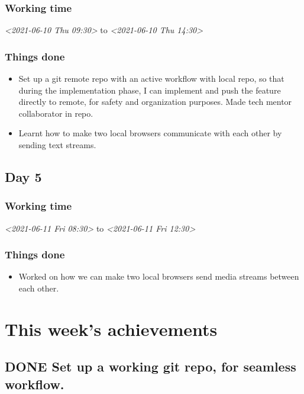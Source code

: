 \documentclass[11pt]{article}
\begin{document}
\subsubsection*{Working time}
\label{sec:org8737acd}
\textit{<2021-06-10 Thu 09:30> } to \textit{<2021-06-10 Thu 14:30>}
\subsubsection*{Things done}
\label{sec:org863a890}
\begin{itemize}
\item Set up a git remote repo with an active workflow with local repo, so that during the implementation phase, I can implement and push the feature directly to remote, for safety and organization purposes. Made tech mentor collaborator in repo.
\item Learnt how to make two local browsers communicate with each other by sending text streams.
\end{itemize}

\subsection*{Day 5}
\label{sec:orge735228}

\subsubsection*{Working time}
\label{sec:org2319456}
\textit{<2021-06-11 Fri 08:30> } to \textit{<2021-06-11 Fri 12:30>}

\subsubsection*{Things done}
\label{sec:org5becaae}
\begin{itemize}
\item Worked on how we can make two local browsers send media streams between each other.
\end{itemize}

\section*{This week's achievements}
\label{sec:org88953ec}
\subsection*{{\bfseries\sffamily DONE} Set up a working git repo, for seamless workflow.}
\label{sec:orga1664fe}
\end{document}
